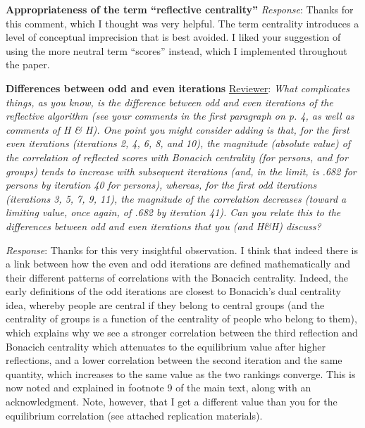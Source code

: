 \documentclass{article}
\begin{document}
\noindent\textbf{Appropriateness of the term ``reflective centrality''}\newline
\textit{Response}: Thanks for this comment, which I thought was very helpful. The term centrality introduces a level of conceptual imprecision that is best avoided. I liked your suggestion of using the more neutral term ``scores'' instead, which I implemented throughout the paper.\newline

\noindent\textbf{Differences between odd and even iterations}\newline
\underline{Reviewer}: \textit{What complicates things, as you know, is the difference between odd and even iterations of the reflective algorithm (see your comments in the first paragraph on p. 4, as well as comments of H \& H). One point you might consider adding is that, for the first even iterations (iterations 2, 4, 6, 8, and 10), the magnitude (absolute value) of the correlation of reflected scores with Bonacich centrality (for persons, and for groups) tends to increase with subsequent iterations (and, in the limit, is .682 for persons by iteration 40 for persons), whereas, for the first odd iterations (iterations 3, 5, 7, 9, 11), the magnitude of the correlation decreases (toward a limiting value, once again, of .682 by iteration 41). Can you relate this to the differences between odd and even iterations that you (and H\&H) discuss?}

\noindent\textit{Response}: Thanks for this very insightful observation. I think that indeed there is a link between how the even and odd iterations are defined mathematically and their different patterns of correlations with the Bonacich centrality. Indeed, the early definitions of the odd iterations are closest to Bonacich's dual centrality idea, whereby people are central if they belong to central groups (and the centrality of groups is a function of the centrality of people who belong to them), which explains why we see a stronger correlation between the third reflection and Bonacich centrality which attenuates to the equilibrium value after higher reflections, and a lower correlation between the second iteration and the same quantity, which increases to the same value as the two rankings converge. This is now noted and explained in footnote 9 of the main text, along with an acknowledgment. Note, however, that I get a different value than you for the equilibrium correlation (see attached replication materials). \newline
\end{document}
